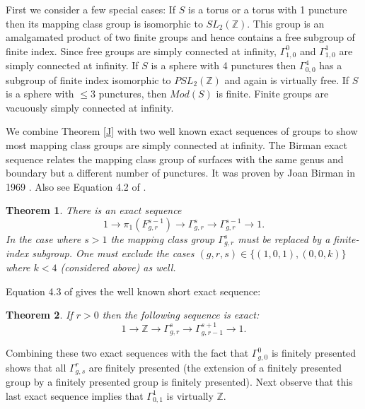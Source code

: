 \documentclass[12pt]{article}
\newtheorem{theorem}{Theorem}[subsection]
\begin{document}
First we consider a few special cases: If $S$ is a torus or a torus with 1 puncture then its mapping class group is isomorphic to $SL_2(\mathbb Z)$. This group is an amalgamated product of two finite groups and hence contains a free subgroup of finite index. Since free groups are simply connected at infinity, $\Gamma_{1,0}^0$ and $\Gamma_{1,0}^1$ are simply connected at infinity. If $S$ is a sphere with 4 punctures then $\Gamma_{0,0}^4$ has a subgroup of finite index isomorphic to $PSL_2(\mathbb Z)$ and again is virtually free. If $S$ is a sphere with $\leq 3$ punctures, then $Mod(S)$ is finite. Finite groups are vacuously simply connected at infinity. 

We combine Theorem \ref{J} with two well known exact sequences of groups to show most mapping class groups are simply connected at infinity.
The Birman exact sequence relates the mapping class group of surfaces with the same genus and boundary but a different number of punctures. It was proven by Joan Birman in 1969 \cite{BES69}. Also see Equation 4.2 of \cite{Har86}.


 \begin{theorem} \label{BES} There is an exact sequence
    $$ 1\to \pi_1 ( F_{g,r}^{s-1} )\to \Gamma_{g,r}^s \to  \Gamma_{g,r}^{s-1} \to 1.$$ 
In the case where $s>1$ the mapping class group $\Gamma_{g,r}^s$ must be replaced by a finite-index subgroup. 
One must exclude the cases $(g,r,s)\in \{(1,0,1), (0,0,k)\}$ where $k<4$ (considered above) as well.
\end{theorem} 

Equation 4.3 of \cite{Har86} gives the well known short exact sequence:
\begin{theorem} \label{HES}
If $r>0$ then the following sequence is exact:
  $$1\to \mathbb Z\to \Gamma_{g,r}^s\to \Gamma_{g,r-1}^{s+1}\to 1.$$
\end{theorem}
Combining these two exact sequences with the fact that $\Gamma_{g,0}^0$ is finitely presented shows that all $\Gamma_{g,s}^r$ are finitely presented (the extension of a finitely presented group by a finitely presented group is finitely presented). 
Next observe that this last exact sequence implies that $\Gamma_{0,1}^1$ is virtually $\mathbb Z$. 
\end{document}
